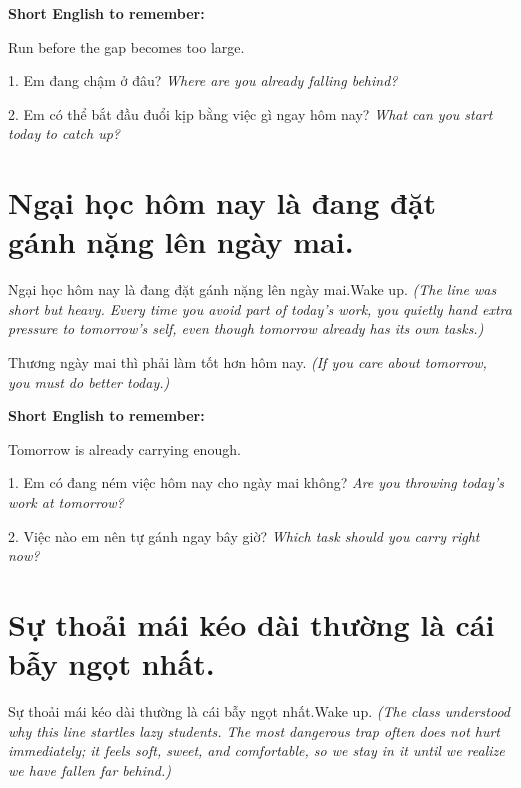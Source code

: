 \begin{ghinhoanh}
\textbf{Short English to remember:}

Run before the gap becomes too large.

\end{ghinhoanh}

\begin{tuhocnhanh}
1. Em đang chậm ở đâu? \textit{Where are you already falling behind?}

2. Em có thể bắt đầu đuổi kịp bằng việc gì ngay hôm nay? \textit{What can you start today to catch up?}
\end{tuhocnhanh}
\ngancach

\section{Ngại học hôm nay là đang đặt gánh nặng lên ngày mai.}
\begin{truyen}{Ngại học hôm nay là đang đặt gánh nặng lên ngày mai.}{Wake up.}
\textit{(The line was short but heavy. Every time you avoid part of today's work, you quietly hand extra pressure to tomorrow's self, even though tomorrow already has its own tasks.)}
\end{truyen}

\begin{baihoc}
Thương ngày mai thì phải làm tốt hơn hôm nay.
\textit{(If you care about tomorrow, you must do better today.)}
\end{baihoc}

\begin{ghinhoanh}
\textbf{Short English to remember:}

Tomorrow is already carrying enough.

\end{ghinhoanh}

\begin{tuhocnhanh}
1. Em có đang ném việc hôm nay cho ngày mai không? \textit{Are you throwing today's work at tomorrow?}

2. Việc nào em nên tự gánh ngay bây giờ? \textit{Which task should you carry right now?}
\end{tuhocnhanh}
\ngancach

\section{Sự thoải mái kéo dài thường là cái bẫy ngọt nhất.}
\begin{truyen}{Sự thoải mái kéo dài thường là cái bẫy ngọt nhất.}{Wake up.}
\textit{(The class understood why this line startles lazy students. The most dangerous trap often does not hurt immediately; it feels soft, sweet, and comfortable, so we stay in it until we realize we have fallen far behind.)}
\end{truyen}

